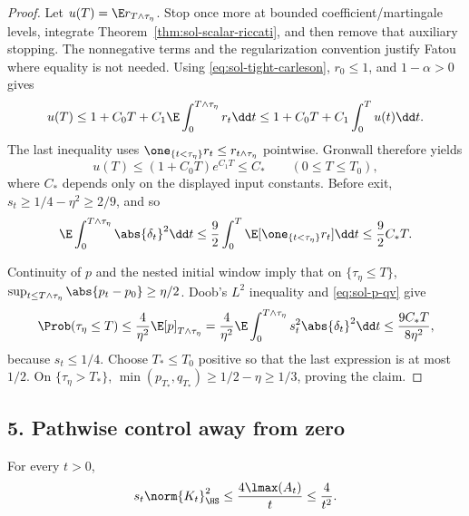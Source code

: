 \documentclass[../main.tex]{subfiles}
\begin{document}
\begin{proof}
Let $u(T)=\E r_{T\wedge\tau_\eta}$.  Stop once more at bounded coefficient/martingale levels,
integrate Theorem~\ref{thm:sol-scalar-riccati}, and then remove that auxiliary stopping.  The
nonnegative terms and the regularization convention justify Fatou where equality is not
needed.  Using \eqref{eq:sol-tight-carleson}, $r_0\le1$, and $1-\alpha>0$ gives
\[
 u(T)\le1+C_0T+C_1\E\int_0^{T\wedge\tau_\eta}r_t\dd t
 \le1+C_0T+C_1\int_0^T u(t)\dd t.
\]
The last inequality uses
$\one_{\{t<\tau_\eta\}}r_t\le r_{t\wedge\tau_\eta}$ pointwise.  Gronwall therefore yields
\begin{equation}\label{eq:sol-u-bound}
 u(T)\le(1+C_0T)e^{C_1T}\le C_*\qquad(0\le T\le T_0),
\end{equation}
where $C_*$ depends only on the displayed input constants.  Before exit,
$s_t\ge1/4-\eta^2\ge2/9$, and so
\begin{equation}\label{eq:sol-centroid-window}
 \E\int_0^{T\wedge\tau_\eta}\abs{\delta_t}^2\dd t
 \le\frac92\int_0^T\E[\one_{\{t<\tau_\eta\}}r_t]\dd t
 \le\frac92C_*T.
\end{equation}

Continuity of $p$ and the nested initial window imply that on $\{\tau_\eta\le T\}$,
$\sup_{t\le T\wedge\tau_\eta}\abs{p_t-p_0}\ge\eta/2$.  Doob's $L^2$ inequality and
\eqref{eq:sol-p-qv} give
\[
 \Prob(\tau_\eta\le T)
 \le\frac4{\eta^2}\E[p]_{T\wedge\tau_\eta}
 =\frac4{\eta^2}\E\int_0^{T\wedge\tau_\eta}s_t^2\abs{\delta_t}^2\dd t
 \le\frac{9C_*T}{8\eta^2},
\]
because $s_t\le1/4$.  Choose $T_*\le T_0$ positive so that the last expression is at most
$1/2$.  On $\{\tau_\eta>T_*\}$,
$\min(p_{T_*},q_{T_*})\ge1/2-\eta\ge1/3$, proving the claim.
\end{proof}

\subsection*{5. Pathwise control away from zero}

\begin{lemma}[= Lemma~\ref{lem:pathwise-BL}]
\label{lem:sol-pathwise-BL}
For every $t>0$,
\[
 s_t\norm{K_t}_\HS^2\le\frac{4\lmax(A_t)}t\le\frac4{t^2}.
\]
\end{lemma}
\end{document}
